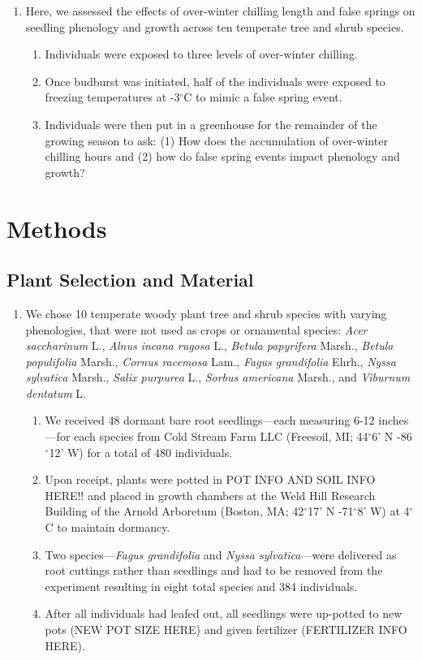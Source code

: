\documentclass{article}\usepackage[]{graphicx}\usepackage[]{color}
\begin{document}
\begin{enumerate}
\item Here, we assessed the effects of over-winter chilling length and false springs on seedling phenology and growth across ten temperate tree and shrub species. 
  \begin{enumerate}
  \item Individuals were exposed to three levels of over-winter chilling. 
  \item Once budburst was initiated, half of the individuals were exposed to freezing temperatures at -3$^{\circ}$C to mimic a false spring event. 
  \item Individuals were then put in a greenhouse for the remainder of the growing season to ask: (1) How does the accumulation of over-winter chilling hours and (2) how do false spring events impact phenology and growth?
  \end{enumerate}
\end{enumerate}
  
\section*{Methods}
\subsection*{Plant Selection and Material}
\begin{enumerate}
\item We chose 10 temperate woody plant tree and shrub species with varying phenologies, that were not used as crops or ornamental species: \textit{Acer saccharinum} L., \textit{Alnus incana rugosa} L., \textit{Betula papyrifera} Marsh., \textit{Betula populifolia} Marsh., \textit{Cornus racemosa} Lam., \textit{Fagus grandifolia} Ehrh., \textit{Nyssa sylvatica} Marsh., \textit{Salix purpurea} L., \textit{Sorbus americana} Marsh., and \textit{Viburnum dentatum} L.
  \begin{enumerate}
  \item We received 48 dormant bare root seedlings---each measuring 6-12 inches---for each species from Cold Stream Farm LLC (Freesoil, MI; 44$^{\circ}$6' N -86$^{\circ}$12' W) for a total of 480 individuals.
  \item Upon receipt, plants were potted in POT INFO AND SOIL INFO HERE!! and placed in growth chambers at the Weld Hill Research Building of the Arnold Arboretum (Boston, MA; 42$^{\circ}$17' N -71$^{\circ}$8' W) at 4$^{\circ}$C to maintain dormancy.
  \item Two species---\textit{Fagus grandifolia} and \textit{Nyssa sylvatica}---were delivered as root cuttings rather than seedlings and had to be removed from the experiment resulting in eight total species and 384 individuals.
  \item After all individuals had leafed out, all seedlings were up-potted to new pots (NEW POT SIZE HERE) and given fertilizer (FERTILIZER INFO HERE).
  \end{enumerate}
\end{enumerate}
\end{document}
